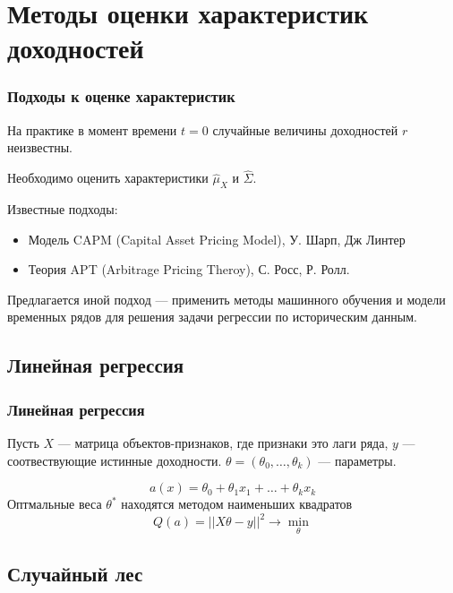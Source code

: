 \documentclass{beamer}
\begin{document}



\section{Методы оценки характеристик доходностей}

\begin{frame}
    \frametitle{Подходы к оценке характеристик}

    На практике в момент времени $t=0$ случайные величины доходностей $r$ неизвестны.
    
    Необходимо оценить характеристики $\hat{\mu}_X$ и $\hat{\Sigma}$.

    Известные подходы:
    \begin{itemize}
        \item Модель CAPM (Capital Asset Pricing Model), У. Шарп, Дж Линтер
        \item Теория  APT (Arbitrage Pricing Theroy), С. Росс, Р. Ролл.
    \end{itemize}
    
    Предлагается иной подход --- применить методы машинного обучения и модели временных
    рядов для решения задачи регрессии по историческим данным.
\end{frame}

\subsection{Линейная регрессия}

\begin{frame}
    \frametitle{Линейная регрессия}
    Пусть $X$ --- матрица объектов-признаков, где признаки это лаги ряда,
    $y$ --- соотвествующие истинные доходности.
    $\theta = (\theta_0, \dots, \theta_k)$ --- параметры.
    
    \[
        a(x) = \theta_0 + \theta_1 x_1 + \dots + \theta_k x_k
    \]
    Оптмальные веса $\theta^*$ находятся методом наименьших квадратов
    \[
        Q(a) = || X\theta - y||^2 \rightarrow \min_{\theta}
    \]
\end{frame}

\subsection{Случайный лес}
\end{document}
